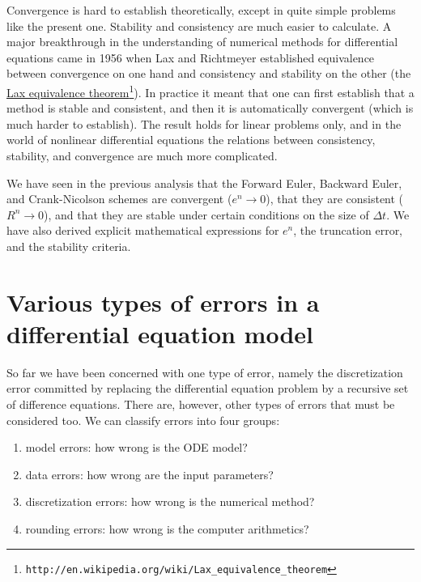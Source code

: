 \documentclass[graybox,sectrefs,envcountresetchap,open=right,final]{svmonodo}
\begin{document}
Convergence is hard to establish theoretically, except in quite simple
problems like the present one. Stability and consistency are much
easier to calculate. A major breakthrough in the understanding of
numerical methods for differential equations came in 1956 when Lax and
Richtmeyer established equivalence between convergence on one hand and
consistency and stability on the other (the \href{{http://en.wikipedia.org/wiki/Lax_equivalence_theorem}}{Lax equivalence theorem}\footnote{\texttt{http://en.wikipedia.org/wiki/Lax\_equivalence\_theorem}}).  In practice
it meant that one can first establish that a method is stable and
consistent, and then it is automatically convergent (which is much
harder to establish).  The result holds for linear problems only, and
in the world of nonlinear differential equations the relations between
consistency, stability, and convergence are much more complicated.

We have seen in the previous analysis that the Forward Euler,
Backward Euler, and Crank-Nicolson schemes are convergent ($e^n\rightarrow 0$),
that they are consistent ($R^n\rightarrow 0$), and that they are
stable under certain conditions on the size of $\Delta t$.
We have also derived explicit mathematical expressions for $e^n$,
the truncation error, and the stability criteria.


\section{Various types of errors in a differential equation model}

So far we have been concerned with one type of error, namely the
discretization error committed by replacing the differential equation
problem by a recursive set of difference equations. There are,
however, other types of errors that must be considered too. We can
classify errors into four groups:

\begin{enumerate}
\item model errors: how wrong is the ODE model?

\item data errors: how wrong are the input parameters?

\item discretization errors: how wrong is the numerical method?

\item rounding errors: how wrong is the computer arithmetics?
\end{enumerate}
\end{document}
